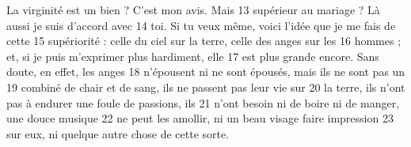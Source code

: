 La virginité est un bien ? C'est mon avis. Mais	 
13	 	supérieur au mariage ? Là aussi je suis d'accord avec	 
14	 	toi. Si tu veux même, voici l'idée que je me fais de cette	 
15	 	supériorité : celle du ciel sur la terre, celle des anges sur les	 
16	 	hommes ; et, si je puis m'exprimer plus hardiment, elle	 
17	 	est plus grande encore. Sans doute, en effet, les anges	 
18	 	n'épousent ni ne sont épousés, mais ils ne sont pas un	 
19	 	combiné de chair et de sang, ils ne passent pas leur vie sur	 
20	 	la terre, ils n'ont pas à endurer une foule de passions, ils	 
21	 	n'ont besoin ni de boire ni de manger, une douce musique	 
22	 	ne peut les amollir, ni un beau visage faire impression	 
23	 	sur eux, ni quelque autre chose de cette sorte.